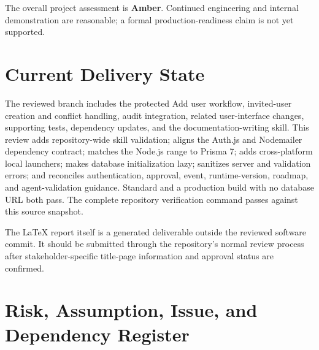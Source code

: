 \documentclass[12pt]{report}
\newcommand{\statusamber}[1]{\textcolor{statusamber}{\textbf{#1}}}
\begin{document}
The overall project assessment is \statusamber{Amber}. Continued engineering and internal demonstration are reasonable; a formal production-readiness claim is not yet supported.

\section{Current Delivery State}

The reviewed branch includes the protected Add user workflow, invited-user creation and conflict handling, audit integration, related user-interface changes, supporting tests, dependency updates, and the documentation-writing skill. This review adds repository-wide skill validation; aligns the Auth.js and Nodemailer dependency contract; matches the Node.js range to Prisma 7; adds cross-platform local launchers; makes database initialization lazy; sanitizes server and validation errors; and reconciles authentication, approval, event, runtime-version, roadmap, and agent-validation guidance. Standard  and a production build with no database URL both pass. The complete repository verification command passes against this source snapshot.

The LaTeX report itself is a generated deliverable outside the reviewed software commit. It should be submitted through the repository's normal review process after stakeholder-specific title-page information and approval status are confirmed.

\section{Risk, Assumption, Issue, and Dependency Register}
\end{document}
